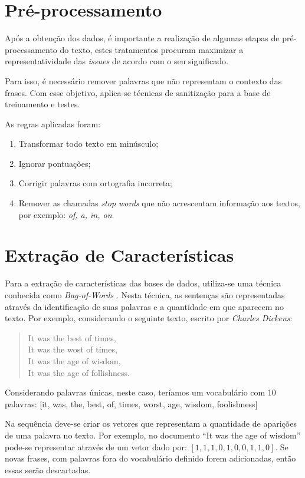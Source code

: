 \documentclass[conference]{IEEEtran}
\begin{document}
\section{Pré-processamento}

Após a obtenção dos dados, é importante a realização de algumas etapas de pré-processamento do texto, estes tratamentos procuram maximizar a representatividade das \textit{issues} de acordo com o seu significado.

Para isso, é necessário remover palavras que não representam o contexto das frases. Com esse objetivo, aplica-se técnicas de sanitização para a base de treinamento e testes.

As regras aplicadas foram:

\begin{enumerate}
    \item Transformar todo texto em minúsculo;
    \item Ignorar pontuações;
    \item Corrigir palavras com ortografia incorreta;
    \item Remover as chamadas \textit{stop words} que não acrescentam informação aos textos, por exemplo: \textit{of, a, in, on}.
\end{enumerate}

\section{Extração de Características}

Para a extração de características das bases de dados, utiliza-se uma técnica conhecida como \textit{Bag-of-Words} \cite{Mohey:Bag}. Nesta técnica, as sentenças são representadas através da identificação de suas palavras e a quantidade em que aparecem no texto. Por exemplo, considerando o seguinte texto, escrito por \textit{Charles Dickens}:

\begin{quote}
    It was the best of times,\\
    It was the wost of times,\\
    It was the age of wisdom,\\
    It was the age of follishness.
\end{quote}

Considerando palavras únicas, neste caso, teríamos um vocabulário com 10 palavras: [it, was, the, best, of, times, worst, age, wisdom, foolishness]

Na sequência deve-se criar os vetores que representam a quantidade de aparições de uma palavra no texto. Por exemplo, no documento ``It was the age of wisdom'' pode-se representar através de um vetor dado por: $[1, 1, 1, 0, 1, 0, 0, 1, 1, 0]$. Se novas frases, com palavras fora do vocabulário definido forem adicionadas, então essas serão descartadas.
\end{document}
